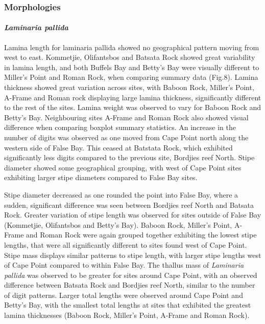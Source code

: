 \documentclass[10pt,a4,]{article}
\begin{document}
\hypertarget{morphologies}{%
\subsubsection{Morphologies}\label{morphologies}}

\hypertarget{laminaria-pallida}{%
\paragraph{\texorpdfstring{\emph{Laminaria
pallida}}{Laminaria pallida}}\label{laminaria-pallida}}

Lamina length for laminaria pallida showed no geographical pattern
moving from west to east. Kommetjie, Olifantsbos and Batsata Rock showed
great variability in lamina length, and both Buffels Bay and Betty's Bay
were visually different to Miller's Point and Roman Rock, when comparing
summary data (Fig.8). Lamina thickness showed great variation across
sites, with Baboon Rock, Miller's Point, A-Frame and Roman rock
displaying large lamina thickness, significantly different to the rest
of the sites. Lamina weight was observed to vary for Baboon Rock and
Betty's Bay. Neighbouring sites A-Frame and Roman Rock also showed
visual difference when comparing boxplot summary statistics. An increase
in the number of digits was observed as one moved from Cape Point north
along the western side of False Bay. This ceased at Batstata Rock, which
exhibited significantly less digits compared to the previous site,
Bordjies reef North. Stipe diameter showed some geographical grouping,
with west of Cape Point sites exhibiting larger stipe diameters compared
to False Bay sites.

Stipe diameter decreased as one rounded the point into False Bay, where
a sudden, significant difference was seen between Bordjies reef North
and Batsata Rock. Greater variation of stipe length was observed for
sites outside of False Bay (Kommetjie, Olifantsbos and Betty's Bay).
Baboon Rock, Miller's Point, A-Frame and Roman Rock were again grouped
together exhibiting the lowest stipe lengths, that were all
significantly different to sites found west of Cape Point. Stipe mass
displays similar patterns to stipe length, with larger stipe lengths
west of Cape Point compared to within False Bay. The thallus mass of
\emph{Laminaria pallida} was observed to be greater for sites around
Cape Point, with an observed difference between Batsata Rock and
Bordjies reef North, similar to the number of digit patterns. Larger
total lengths were observed around Cape Point and Betty's Bay, with the
smallest total lengths at sites that exhibited the greatest lamina
thicknesses (Baboon Rock, Miller's Point, A-Frame and Roman Rock).
\end{document}
